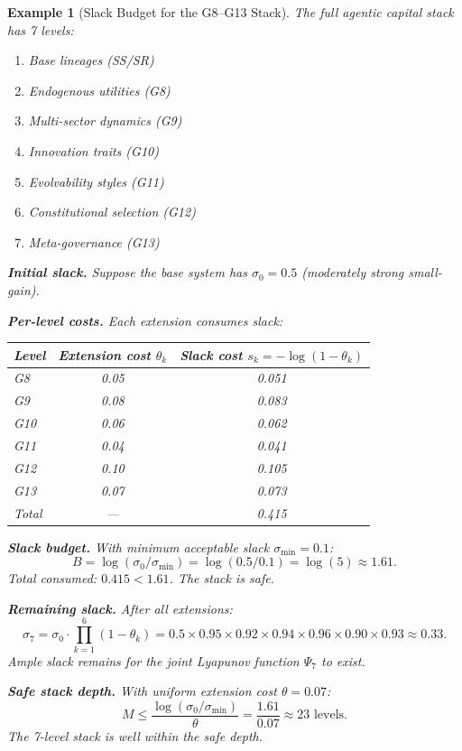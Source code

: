 \documentclass[12pt]{article}
\newtheorem{example}[theorem]{Example}
\begin{document}
\begin{example}[Slack Budget for the G8--G13 Stack]
\label{ex:slack-budget}
The full agentic capital stack has 7 levels:
\begin{enumerate}
    \item Base lineages (SS/SR)
    \item Endogenous utilities (G8)
    \item Multi-sector dynamics (G9)
    \item Innovation traits (G10)
    \item Evolvability styles (G11)
    \item Constitutional selection (G12)
    \item Meta-governance (G13)
\end{enumerate}

\textbf{Initial slack.} Suppose the base system has $\sigma_0 = 0.5$ (moderately strong small-gain).

\textbf{Per-level costs.} Each extension consumes slack:
\begin{center}
\begin{tabular}{lcc}
\toprule
Level & Extension cost $\theta_k$ & Slack cost $s_k = -\log(1-\theta_k)$ \\
\midrule
G8 & 0.05 & 0.051 \\
G9 & 0.08 & 0.083 \\
G10 & 0.06 & 0.062 \\
G11 & 0.04 & 0.041 \\
G12 & 0.10 & 0.105 \\
G13 & 0.07 & 0.073 \\
\midrule
Total & --- & 0.415 \\
\bottomrule
\end{tabular}
\end{center}

\textbf{Slack budget.} With minimum acceptable slack $\sigma_{\min} = 0.1$:
\[
B = \log(\sigma_0 / \sigma_{\min}) = \log(0.5 / 0.1) = \log(5) \approx 1.61.
\]
Total consumed: $0.415 < 1.61$. The stack is safe.

\textbf{Remaining slack.} After all extensions:
\[
\sigma_7 = \sigma_0 \cdot \prod_{k=1}^6 (1 - \theta_k) = 0.5 \times 0.95 \times 0.92 \times 0.94 \times 0.96 \times 0.90 \times 0.93 \approx 0.33.
\]
Ample slack remains for the joint Lyapunov function $\Psi_7$ to exist.

\textbf{Safe stack depth.} With uniform extension cost $\theta = 0.07$:
\[
M \leq \frac{\log(\sigma_0 / \sigma_{\min})}{\theta} = \frac{1.61}{0.07} \approx 23 \text{ levels}.
\]
The 7-level stack is well within the safe depth.
\end{example}
\end{document}
